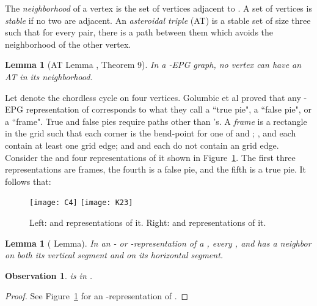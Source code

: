 \documentclass[11pt,3p,times]{elsarticle}
\newenvironment{myproof}{\begin{proof}}{\end{proof}}
\newtheorem{observation}[theorem]{Observation}
\newtheorem{lemma}[theorem]{Lemma}
\begin{document}
The \textit{neighborhood}  of a vertex  is the set of vertices adjacent to .
A set of vertices is \textit{stable} if no two are adjacent. An \textit{asteroidal triple}
(AT) is a stable set of size three such
that for every pair, there is a path between them which avoids the
neighborhood of the other vertex.

\begin{lemma}[AT Lemma \cite{Asi2012}, Theorem 9]\label{lem:AT}
In a -EPG graph, no vertex can have an AT in its
neighborhood.
\end{lemma}

Let  denote the chordless cycle  on four vertices.
Golumbic et al \cite{Gol2009} proved that any -EPG
representation of  corresponds to what they call a ``true
pie", a ``false pie", or a ``frame".  True and false pies require
paths other than 's. A \textit{frame} is a rectangle in the
grid  such that each corner is the bend-point for one
of  and ;  , and  each contain at least one grid edge; and   and  each do not contain an grid edge. Consider
the  and four representations of it shown in
Figure~\ref{fig:C4-K23}. The first three representations are frames,
the fourth is a false pie, and the fifth is a true pie. It follows
that:

\begin{figure}[bth]
\hfill
\texttt{[image: C4]}
\hfill
\texttt{[image: K23]}
\hfill \ \caption{Left:  and representations of it. Right:
 and representations of it.}\label{fig:C4-K23}
\end{figure}
\begin{lemma}[ Lemma]\label{lem:C4}
In an - or -representation of a , every ,  and  has a neighbor on both its vertical segment and on its horizontal segment.
\end{lemma}

\begin{observation}
 is in .
\end{observation}
\begin{myproof}
See Figure~\ref{fig:C4-K23} for an -representation of .
\end{myproof}
\end{document}
